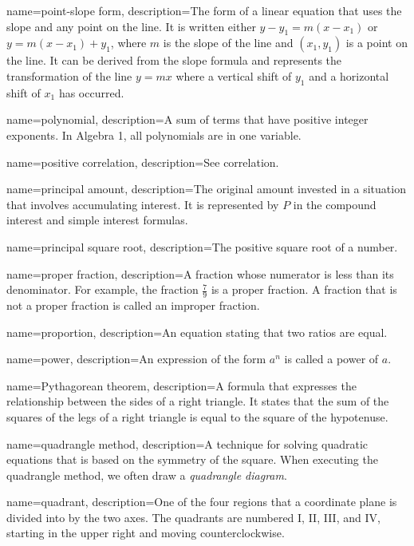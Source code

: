  {
	name=point-slope form,
	description={The form of a linear equation that uses the slope and any point on the line. It is written either $y-y_1 = m(x-x_1)$ or $y=m(x-x_1)+y_1$, where $m$ is the slope of the line and $(x_1,y_1)$ is a point on the line. It can be derived from the slope formula and represents the transformation of the line $y = mx$ where a vertical shift of $y_1$ and a horizontal shift of $x_1$ has occurred.}
}

 {
	name=polynomial,
	description={A sum of terms that have positive integer exponents. In Algebra 1, all polynomials are in one variable.}
}

 {
	name=positive correlation,
	description={See \gls{correlation}.}
}

 {
	name=principal amount,
	description={The original amount invested in a situation that involves accumulating interest. It is represented by $P$ in the \gls{compound interest} and simple interest formulas.}
}

 {
	name=principal square root,
	description={The positive square root of a number.}
}

 {
	name=proper fraction,
	description={A fraction whose \gls{numerator} is less than its \gls{denominator}. For example, the fraction $\frac{7}{9}$ is a proper fraction. A fraction that is not a proper fraction is called an \gls{improper fraction}.}
}

 {
	name=proportion,
	description={An equation stating that two ratios are equal.}
}

 {
	name=power,
	description={An expression of the form $a^n$ is called a power of $a$.}
}
 
 {
	name=Pythagorean theorem,
	description={A formula that expresses the relationship between the sides of a right triangle. It states that the sum of the squares of the legs of a right triangle is equal to the square of the \gls{hypotenuse}.}
}

 {
	name=quadrangle method,
	description={A technique for solving quadratic equations that is based on the symmetry of the square. When executing the quadrangle method, we often draw a \textit{quadrangle diagram}.}
}

 {
	name=quadrant,
	description={One of the four regions that a coordinate plane is divided into by the two axes. The quadrants are numbered I, II, III, and IV, starting in the upper right and moving counterclockwise.}
}

